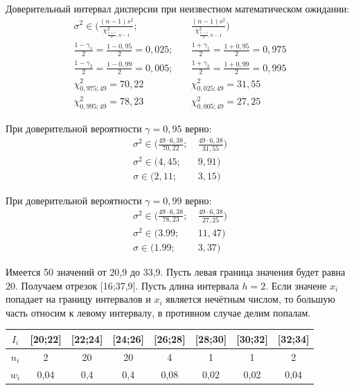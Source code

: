 \documentclass[utf8, a4paper, 14pt, russian, oneside]{book}
\begin{document}
Доверительный интервал дисперсии при неизвестном математическом ожидании:
\begin{align*}
    \sigma^2 \in \Bigg( \frac{(n-1)s^2}{\chi^2_{\tfrac{1+\gamma}{2},n-1}};\ & \frac{(n-1)s^2}{\chi^2_{\tfrac{1-\gamma}{2},n-1}} \Bigg)\\
    \frac{1-\gamma_1}{2} = \frac{1 - 0,95}{2} = 0,025; \quad& \frac{1+\gamma_1}{2} = \frac{1+0,95}{2} = 0,975\\
    \frac{1-\gamma_2}{2} = \frac{1 - 0,99}{2} = 0,005; \quad& \frac{1+\gamma_2}{2} = \frac{1+0,99}{2} = 0,995\\
    \chi^2_{0,975;49} = 70,22 \qquad& \chi^2_{0,025;49} = 31,55 \\
    \chi^2_{0,995;49} = 78,23 \qquad& \chi^2_{0,005;49} = 27,25
\end{align*}

При доверительной вероятности $\gamma=0,95$ верно:
\begin{align*}
    \sigma^2 \in \Big( \frac{49 \cdot 6,38}{70,22};\  & \frac{49 \cdot 6,38}{31,55} \Big)\\
    \sigma^2 \in (4,45;\  & 9,91)\\
    \sigma \in (2,11;\  & 3,15)
\end{align*}

При доверительной вероятности $\gamma=0,99$ верно:
\begin{align*}
    \sigma^2 \in \Big( \frac{49 \cdot 6,38}{78,23};\  & \frac{49 \cdot 6,38}{27,25} \Big)\\
    \sigma^2 \in (3.99;\  & 11,47)\\
    \sigma \in (1.99;\  & 3,37)
\end{align*}

\newpage

Имеется 50 значений от 20,9 до 33,9. Пусть левая граница значения будет равна 20. Получаем отрезок [16;37,9].
Пусть длина интервала $h=2$.
Если значене $x_i$ попадает на границу интервалов и $x_i$ является нечётным числом, то большую часть относим к левому интервалу, в противном
случае делим попалам.
\begin{table}[h!]
    \centering
    \begin{tabular}{|c|c|c|c|c|c|c|c|}
        \hline
        $I_i$ & [20;22] & [22;24] & [24;26] & [26;28] & [28;30] & [30;32] & [32;34]\\
        \hline
        $n_i$ & 2 & 20 & 20 & 4 & 1 & 1 & 2 \\
        \hline
        $w_i$ & 0,04 & 0,4 & 0,4 & 0,08 & 0,02 & 0,02 & 0,04 \\
        \hline
    \end{tabular}
\end{table}
\end{document}
